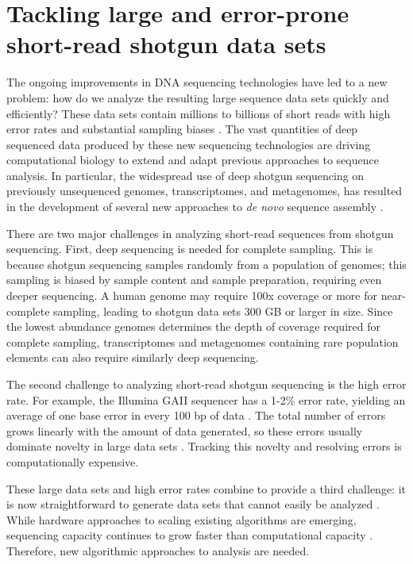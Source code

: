 


\section{Tackling large and error-prone short-read shotgun data sets}

The ongoing improvements in DNA sequencing technologies have led to a new
problem: how do we analyze the resulting large sequence data sets quickly and
efficiently? These data sets contain millions to billions of short reads with
high error rates and substantial sampling biases \cite{pubmed19997069}.  The
vast quantities of deep sequenced data produced by these new sequencing
technologies are driving computational biology to extend and adapt previous
approaches to sequence analysis.  In particular, the widespread use of deep
shotgun sequencing on previously unsequenced genomes, transcriptomes, and
metagenomes, has resulted in the development of several new approaches to {\em
de novo} sequence assembly \cite{pubmed20211242}.

There are two major challenges in analyzing short-read sequences from shotgun
sequencing. First, deep sequencing is needed for complete sampling. This is
because shotgun sequencing samples randomly from a population of genomes;
this sampling is biased by sample content and sample preparation, requiring
even deeper sequencing. A human genome may require 100x coverage or more for
near-complete sampling, leading to shotgun data sets 300 GB or larger in
size\cite{pubmed21187386}. Since the lowest abundance genomes determines the
depth of coverage required for complete sampling, transcriptomes and
metagenomes containing rare population elements can also require similarly deep
sequencing.

The second challenge to analyzing short-read shotgun sequencing is the high
error rate.  For example, the Illumina GAII sequencer has a 1-2\% error rate,
yielding an average of one base error in every 100 bp of data
\cite{pubmed19997069}.  The total number of errors grows linearly with the
amount of data generated, so these errors usually dominate novelty in large
data sets \cite{pubmed21245053}.  Tracking this novelty and resolving errors is
computationally expensive.

These large data sets and high error rates combine to provide a third
challenge: it is now straightforward to generate data sets that cannot easily
be analyzed \cite{pubmed21867570}.  While hardware approaches to scaling
existing algorithms are emerging, sequencing capacity continues to grow faster
than computational capacity \cite{pubmed20441614}.  Therefore, new algorithmic
approaches to analysis are needed.

